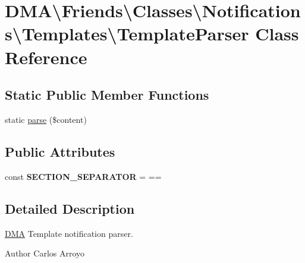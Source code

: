 \hypertarget{classDMA_1_1Friends_1_1Classes_1_1Notifications_1_1Templates_1_1TemplateParser}{}\section{D\+M\+A\textbackslash{}Friends\textbackslash{}Classes\textbackslash{}Notifications\textbackslash{}Templates\textbackslash{}Template\+Parser Class Reference}
\label{classDMA_1_1Friends_1_1Classes_1_1Notifications_1_1Templates_1_1TemplateParser}
\subsection*{Static Public Member Functions}
\begin{DoxyCompactItemize}
\item 
static \hyperlink{classDMA_1_1Friends_1_1Classes_1_1Notifications_1_1Templates_1_1TemplateParser_a9979e7218aa198939d99e9ebbc654327}{parse} (\$content)
\end{DoxyCompactItemize}
\subsection*{Public Attributes}
\begin{DoxyCompactItemize}
\item 
\hypertarget{classDMA_1_1Friends_1_1Classes_1_1Notifications_1_1Templates_1_1TemplateParser_a0671a5759e44ca9e4bb5db9796682f74}{}const {\bfseries S\+E\+C\+T\+I\+O\+N\+\_\+\+S\+E\+P\+A\+R\+A\+T\+O\+R} = \textquotesingle{}==\textquotesingle{}\label{classDMA_1_1Friends_1_1Classes_1_1Notifications_1_1Templates_1_1TemplateParser_a0671a5759e44ca9e4bb5db9796682f74}

\end{DoxyCompactItemize}


\subsection{Detailed Description}
\hyperlink{namespaceDMA}{D\+M\+A} Template notification parser. \begin{DoxyAuthor}{Author}
Carlos Arroyo 
\end{DoxyAuthor}


